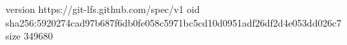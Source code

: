 version https://git-lfs.github.com/spec/v1
oid sha256:5920274cad97b687f6db0fe058c5971bc5cd10d0951adf26df2d4e053dd026c7
size 349680
